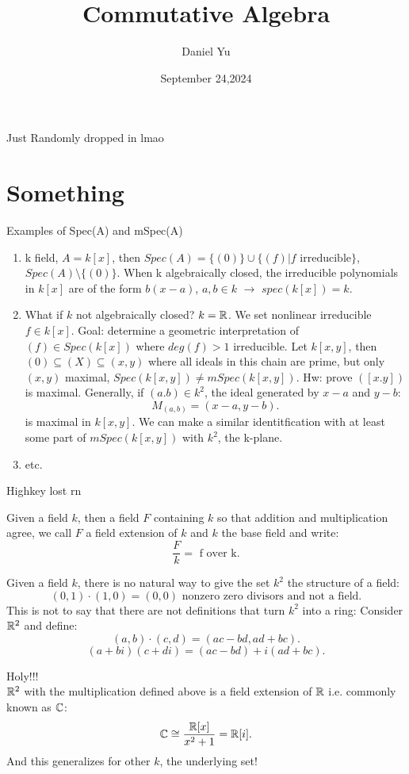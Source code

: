 \documentclass[a4paper]{article}
\title{\Huge{Commutative Algebra}}
\author{\huge{Daniel Yu}}
\date{September 24,2024}
\begin{document}
\maketitle
\newpage%
\tableofcontents
\pagebreak

Just Randomly dropped in lmao

\section{Something}
\begin{note}{Examples of Spec(A) and mSpec(A)}
  \begin{enumerate}
    \item k field, $A = k[x]$, then  $Spec(A) = \{\left( 0 \right) \} \cup \{ \left( f \right)  | f \text{ irreducible} \} $,
      $Spec(A) \setminus \{\left( 0 \right) \} $. When k algebraically closed, the irreducible polynomials in $k[x]$ are of the
      form  $b(x-a)$,  $a,b \in k$ $\to$  $spec(k[x]) = k$.   
    \item What if $k$ not algebraically closed?  $k = \mathbb{R}$. We set nonlinear irreducible $f \in k[x]$. Goal: determine a geometric
      interpretation of $\left( f \right) \in Spec(k[x])$ where $deg(f) >1$ irreducible. Let $k[x,y]$, then  $ \left( 0  \right) 
      \subseteq (X) \subseteq (x,y)$ where all ideals in this chain are prime, but only $(x,y)$ maximal,  $Spec(k[x,y]) \neq m Spec(k[x,y])$.
      Hw: prove $\left( [x.y] \right)$ is maximal. Generally, if $(a.b) \in k^2$, the ideal generated by  $x-a$ and  $y-b$:
       \[
      M_{(a,b)} = \left( x-a,y-b \right)  
      .\] 
      is maximal in $k[x,y]$. We can make a similar identitfication with  at least some part of  $mSpec(k[x,y])$ with  $k^2$, the k-plane. 
    \item etc.
  \end{enumerate}
\end{note}  
Highkey lost rn

\begin{definition}
  Given a field $k$, then a field  $F$ containing  $k$ so that addition and multiplication agree, we call  $F$
  a field extension of  $k$ and  $k$ the base field and write:
   \[
     \frac{F}{k} = \text { f over k}
  .\] 
\end{definition}
\begin{note}
    Given a field $k$, there is no natural way to give the set  $k^{2}$ the structure of a field:
  \[
    (0,1) \cdot (1,0) = (0,0) \text{ nonzero zero divisors and not a field}
  .\] 
  This is not to say that there are not definitions that turn $k^2$ into a ring:
  Consider $\mathbb{R}^{2}$ and define:
  \[
    (a,b) \cdot (c,d) = (ac - bd, ad + bc) 
  .\] 
  \[
    (a + bi)(c + di) = (ac - bd) + i(ad + bc)
  .\] 
\end{note}
\begin{remark}{Holy!!!}\\  
  $\mathbb{R}^{2}$ with the multiplication defined above is a field extension of $\mathbb{R}$ i.e. commonly known
  as $\mathbb{C}$:
   \[
     \mathbb{C} \cong \frac{\mathbb{R}[x]}{x^{2} + 1} = \mathbb{R}[i]
  .\] 
  And this generalizes for other $k$, the underlying set!
\end{remark}
\end{document}
